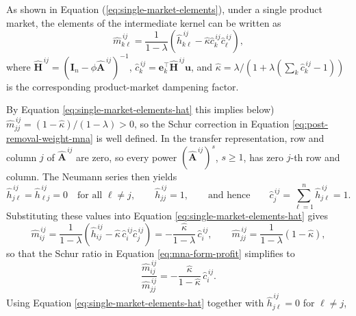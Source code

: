 As shown in Equation (\ref{eq:single-market-elements}), under a single product market, the elements of the intermediate kernel can be written as
\begin{equation}
\widehat m_{k \ell}^{\,ij} = \frac{1}{1-\lambda} \left( \widehat h_{k \ell}^{\,ij} - \widehat\kappa \widehat c_k^{\,ij} \widehat c_\ell^{\,ij} \right),
\label{eq:single-market-elements-hat}
\end{equation}
where
$
\widehat{\mathbf{H}}^{\,ij} = (\mathbf{I}_n-\phi\widehat{\mathbf{A}}^{\,ij})^{-1}$, $\widehat c_k^{\,ij} = \mathbf{e}_k^\top\widehat{\mathbf{H}}^{\,ij}\mathbf{u}$, and $\widehat\kappa = \lambda/(1+\lambda(\sum_k \widehat c_k^{\,ij}-1))$ is the corresponding product-market dampening factor.

By Equation \eqref{eq:single-market-elements-hat} this implies %
below) 
$\widehat m_{jj}^{\,ij}=(1-\widehat\kappa)/(1-\lambda)>0$, so the Schur
correction in Equation \eqref{eq:post-removal-weight-mna} is well defined.
In the transfer representation, row and column $j$ of
$\widehat{\mathbf{A}}^{\,ij}$ are zero, so every power
$(\widehat{\mathbf{A}}^{\,ij})^s$, $s\ge 1$, has zero $j$-th row and column.
The Neumann series then yields
\begin{equation*}
\widehat h_{j\ell}^{\,ij}=\widehat h_{\ell j}^{\,ij}=0
\quad\text{for all } \ell \neq j,
\qquad
\widehat h_{jj}^{\,ij}=1,
\qquad\text{and hence}\qquad
\widehat c_j^{\,ij}=\sum_{\ell=1}^n \widehat h_{j\ell}^{\,ij}=1.
\end{equation*}
Substituting these values into Equation
\eqref{eq:single-market-elements-hat} gives
\begin{equation*}
\widehat m_{ij}^{\,ij}
=
\frac{1}{1-\lambda}
\left(
\widehat h_{ij}^{\,ij}-\widehat\kappa\,\widehat c_i^{\,ij}\widehat c_j^{\,ij}
\right)
=
-\frac{\widehat\kappa}{1-\lambda}\,\widehat c_i^{\,ij},
\qquad
\widehat m_{jj}^{\,ij}
=
\frac{1}{1-\lambda}
\left(
1-\widehat\kappa
\right),
\end{equation*}
so that the Schur ratio in Equation \eqref{eq:mna-form-profit} simplifies to
\begin{equation}
\frac{\widehat m_{ij}^{\,ij}}{\widehat m_{jj}^{\,ij}}
=
-\frac{\widehat\kappa}{1-\widehat\kappa}\,\widehat c_i^{\,ij}.
\label{eq:schur-ratio-single-market}
\end{equation}
Using Equation \eqref{eq:single-market-elements-hat} together with
$\widehat h_{j\ell}^{\,ij}=0$ for $\ell\neq j$,

